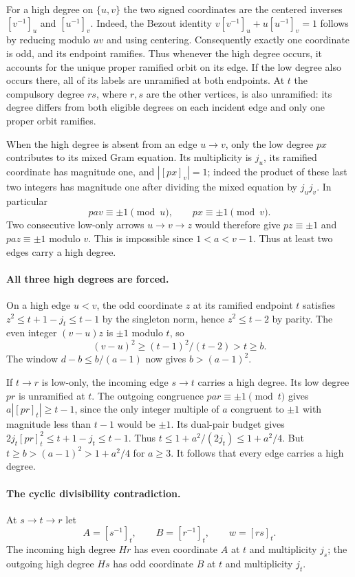\documentclass[11pt,a4paper]{article}
\numberwithin{equation}{section}
\theoremstyle{remark}
\begin{document}
For a high degree on $\{u,v\}$ the two signed
coordinates are the centered inverses $[v^{-1}]_u$ and $[u^{-1}]_v$.
Indeed, the Bezout identity
$ v[v^{-1}]_u+u[u^{-1}]_v=1 $
follows by reducing modulo $uv$ and using centering. Consequently
exactly one coordinate is odd, and its endpoint ramifies.
Thus whenever the high degree occurs, it accounts for the unique
proper ramified orbit on its edge. If the low degree also occurs
there, all of its labels are unramified at both endpoints.
At $t$ the compulsory degree $rs$, where $r,s$ are the other
vertices, is also unramified: its degree differs from both eligible
degrees on each incident edge and only one proper orbit ramifies.

When the high degree is absent from an edge $u\to v$, only the low
degree $px$ contributes to its mixed Gram equation.
Its multiplicity is $j_u$, its ramified coordinate has magnitude
one, and $|[px]_v|=1$; indeed the product of these last two
integers has magnitude one after dividing the mixed equation by
$j_uj_v$. In particular
\[
                         pav\equiv\pm1\pmod u,\qquad
                         px\equiv\pm1\pmod v .
\]
Two consecutive low-only arrows $u\to v\to z$ would therefore give
$pz\equiv\pm1$ and $paz\equiv\pm1$ modulo $v$. This is impossible
since $1<a<v-1$. Thus at least two edges carry a high degree.

\paragraph{All three high degrees are forced.}
On a high edge $u<v$, the odd coordinate $z$ at its ramified
endpoint $t$ satisfies $z^2\le t+1-j_t\le t-1$ by the singleton
norm, hence $z^2\le t-2$ by parity. The even integer $(v-u)z$
is $\pm1$ modulo $t$, so
\[
 (v-u)^2\ge (t-1)^2/(t-2)>t\ge b.
\]
The window $d-b\le b/(a-1)$ now gives $b>(a-1)^2$.

If $t\to r$ is low-only, the incoming edge $s\to t$ carries a
high degree. Its low degree $pr$ is unramified at $t$.
The outgoing congruence $par\equiv\pm1\pmod t$ gives
$a|[pr]_t|\ge t-1$, since the only integer multiple of $a$
congruent to $\pm1$ with magnitude less than $t-1$ would be
$\pm1$. Its dual-pair budget gives
$2j_t[pr]_t^2\le t+1-j_t\le t-1$. Thus
$t\le1+a^2/(2j_t)\le1+a^2/4$.
But $t\ge b>(a-1)^2>1+a^2/4$ for $a\ge3$.
It follows that every edge carries a high degree.

\paragraph{The cyclic divisibility contradiction.}
At $s\to t\to r$ let
\[
                 A=[s^{-1}]_t,\qquad B=[r^{-1}]_t,
                 \qquad w=[rs]_t .
\]
The incoming high degree $Hr$ has even coordinate $A$ at $t$ and
multiplicity $j_s$; the outgoing high degree $Hs$ has odd
coordinate $B$ at $t$ and multiplicity $j_t$.
\end{document}
